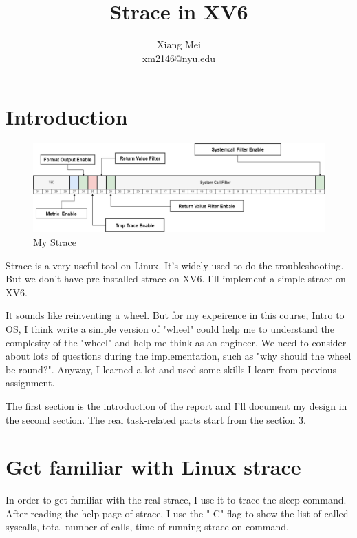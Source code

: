 \documentclass[11pt,oneside,a4paper]{article}
\title{Strace in XV6}
\author{Xiang Mei \\ \href{mailto:xm2146@nyu.edu}{xm2146@nyu.edu} }
\begin{document}
\maketitle
\section{Introduction}

\begin{figure}[H]
    \includegraphics[width=4.75in]{pstrace.png}
    \centering
    \caption{My Strace}
\end{figure}

Strace is a very useful tool on Linux. It's widely used to do the troubleshooting.
But we don't have pre-installed strace on XV6. I'll implement a simple strace on XV6.

It sounds like reinventing a wheel. But for my expeirence in this course, Intro to OS,
I think write a simple version of "wheel" could help me to understand the
complesity of the "wheel" and help me think as an engineer. We need to consider
about lots of questions during the implementation, such as "why should the wheel be 
round?". Anyway, I learned a lot and used some skills I learn from previous assignment.

The first section is the introduction of the report and I'll document my design in the
second section. The real task-related parts start from the section 3.

\section{Get familiar with Linux strace}
In order to get familiar with the real strace, I use it to trace the sleep command.
After reading the help page of strace, I use the "-C" flag to show the list of called
syscalls, total number of calls, time of running strace on command.
\end{document}
